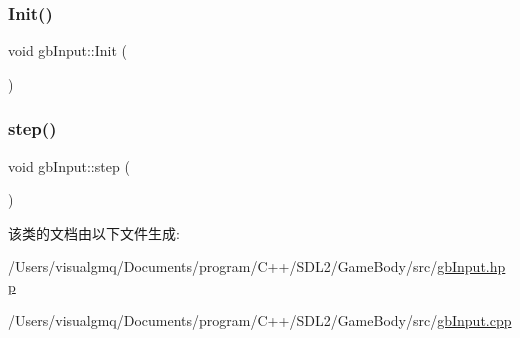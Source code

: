 \subsubsection{\texorpdfstring{Init()}{Init()}}
{\footnotesize\ttfamily void gb\+Input\+::\+Init (\begin{DoxyParamCaption}{ }\end{DoxyParamCaption})\hspace{0.3cm}{\ttfamily [static]}}

\mbox{\label{classgb_input_ac294faea739dc21a97cd651208bbeb29}} 
\subsubsection{\texorpdfstring{step()}{step()}}
{\footnotesize\ttfamily void gb\+Input\+::step (\begin{DoxyParamCaption}{ }\end{DoxyParamCaption})\hspace{0.3cm}{\ttfamily [static]}}



该类的文档由以下文件生成\+:\begin{DoxyCompactItemize}
\item 
/\+Users/visualgmq/\+Documents/program/\+C++/\+S\+D\+L2/\+Game\+Body/src/\mbox{\hyperlink{gb_input_8hpp}{gb\+Input.\+hpp}}\item 
/\+Users/visualgmq/\+Documents/program/\+C++/\+S\+D\+L2/\+Game\+Body/src/\mbox{\hyperlink{gb_input_8cpp}{gb\+Input.\+cpp}}\end{DoxyCompactItemize}
